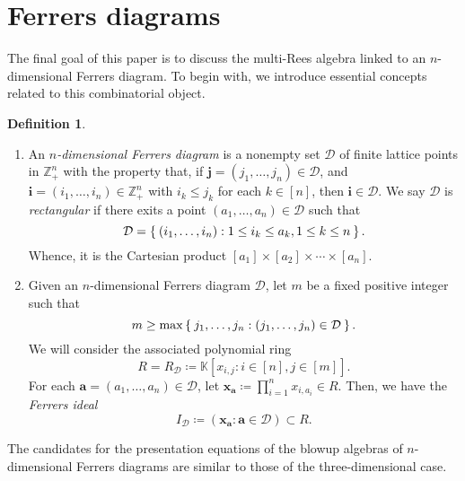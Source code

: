 \documentclass[11pt,a4paper,reqno,dvipsnames]{amsart}
\theoremstyle{plain}
\theoremstyle{definition}
\newtheorem{Assumptions and Discussion}[Theorem]{Assumptions and Discussion}
\newtheorem{Definition}[Theorem]{Definition}
\theoremstyle{remark}
\def\KK{{\mathbb K}}
\def\ZZ{{\mathbb Z}}
\newcommand\bda{{\bm a}}
\newcommand\bdi{{\bm i}}
\newcommand\bdj{{\bm j}}
\newcommand\bdx{{\bm x}}
\newcommand\calD{\mathcal{D}}
\begin{document}
\section{Ferrers diagrams}


The final goal of this paper is to discuss the multi-Rees algebra linked to an $n$-dimensional Ferrers diagram. To begin with, we introduce essential concepts related to this combinatorial object.

\begin{Definition}
    \label{nF}
    \begin{enumerate}[a]
        \item An \emph{$n$-dimensional Ferrers diagram} is a nonempty set $\calD$ of finite lattice points in $ \ZZ_+^n$ with the property that, if $\bdj=(j_1,\ldots,j_n) \in \calD$, and $\bdi=(i_1,\ldots,i_n)\in \ZZ_+^n$ with $i_k\le j_k$ for each $k\in [n]$, then $\bdi\in \calD$. We say $\calD$ is \emph{rectangular} if there exits a point $(a_1,\ldots,a_n) \in \calD$ such that
            \[
                \calD=\Set{(i_1,\dots,i_n):1\le i_k \le a_k, 1\le k\le n}.
            \]
        Whence, it is the Cartesian product $[a_1]\times [a_2] \times \cdots \times [a_n]$.

        \item Given an $n$-dimensional Ferrers diagram $\calD$, let $m$ be a fixed positive integer such that
            \[
                m\ge \max\Set{j_1,\dots,j_n:(j_1,\ldots, j_n)\in\calD}.
            \]
            We will consider the associated polynomial ring
            \[
                R=R_\calD\coloneqq \KK[x_{i,j} : i\in [n], j\in [m]].
            \]
            For each $\bda=(a_1,\dots,a_n)\in \calD$, let $\bdx_\bda\coloneqq \prod_{i=1}^n x_{i,a_i}\in R$. Then, we have the \emph{Ferrers ideal}
            \[
                I_{\calD}\coloneqq  \left( \bdx_{\bda}:\bda \in \calD \right)\subset R.
            \]
    \end{enumerate}
\end{Definition}



The candidates for the presentation equations of the blowup algebras of $n$-dimensional Ferrers diagrams are similar to those of the three-dimensional case.
\end{document}

